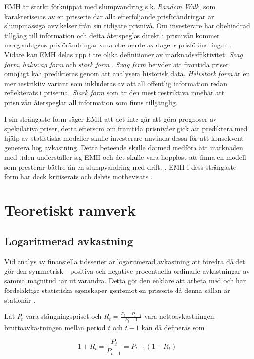 \documentclass[12pt]{article}
\begin{document}
EMH är starkt förknippat med slumpvandring s.k. \emph{Random Walk}, som karakteriseras av en prisserie där alla efterföljande prisförändringar är slumpmässiga avvikelser från sin tidigare prisnivå. Om investerare har obehindrad tillgång till information och detta återspeglas direkt i prisnivån kommer morgondagens prisförändringar vara oberoende av dagens prisförändringar \parencite{EMH}. Vidare kan EMH delas upp i tre olika definitioner av marknadseffiktivitet: \emph{Svag form}, \emph{halvsvag form} och \emph{stark form} \parencite{Fama1970}. \emph{Svag form} betyder att framtida priser omöjligt kan predikteras genom att analysera historisk data. \emph{Halvstark form} är en mer restriktiv variant som inkluderas av att all offentlig information redan reflekterats i priserna. \emph{Stark form} som är den mest restriktiva innebär att prisnivån återspeglar all information som finns tillgänglig.

I sin strängaste form säger EMH att det inte går att göra prognoser av spekulativa priser, detta eftersom om framtida prisnivåer gick att prediktera med hjälp av statistiska modeller skulle investerare använda dessa för att konsekvent generera hög avkastning. Detta beteende skulle därmed medföra att marknaden med tiden underställer sig EMH och det skulle vara hopplöst att finna en modell som presterar bättre än en slumpvandring med drift. \parencite{EMHforecast}. EMH i dess strängaste form har dock kritiserats och delvis motbevisats \parencite{basu1977investment, ball1978anomalies}.

\section{Teoretiskt ramverk}
\subsection{Logaritmerad avkastning}
Vid analys av finansiella tidsserier är logaritmerad avkastning att föredra då det gör den symmetrisk - positiva och negative procentuella ordinarie avkastningar av samma magnitud tar ut varandra. Detta gör den enklare att arbeta med och har fördelaktiga statistiska egenskaper gentemot en prisserie då denna sällan är stationär \parencite{Tsay2010}.

Låt \(P_t\) vara stängningspriset och $R_{t}=\frac{P_{t} - P_{t-1}}{P_t-1}$ vara nettoavkastningen, bruttoavkastningen mellan period $t$ och $t-1$ kan då defineras som

\begin{equation*}
    1+R_{t} = \frac{P_{t}}{P_{t-1}} = P_{t-1}(1+R_{t})
\end{equation*}
\end{document}
